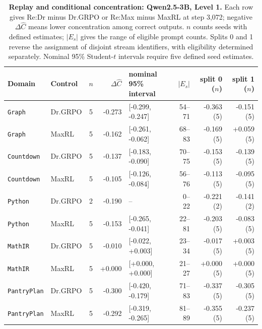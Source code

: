 \begin{table}[!htbp]
\centering
\scriptsize
\setlength{\tabcolsep}{3pt}
\begin{tabular}{@{}llcrlrrr@{}}
\toprule
Domain & Control & $n$ & $\Delta\widehat C$ & nominal 95\% interval & $|E_s|$ & split 0 ($n$) & split 1 ($n$) \\
\midrule
\texttt{Graph} & Dr.GRPO & 5 & -0.273 & [-0.299, -0.247] & 54--71 & -0.363 (5) & -0.151 (5) \\
\texttt{Graph} & MaxRL & 5 & -0.162 & [-0.261, -0.062] & 68--83 & -0.169 (5) & +0.059 (5) \\
\texttt{Countdown} & Dr.GRPO & 5 & -0.137 & [-0.183, -0.090] & 70--75 & -0.153 (5) & -0.139 (5) \\
\texttt{Countdown} & MaxRL & 5 & -0.105 & [-0.126, -0.084] & 56--76 & -0.113 (5) & -0.095 (5) \\
\texttt{Python} & Dr.GRPO & 2 & -0.190 & -- & 0--22 & -0.221 (2) & -0.141 (2) \\
\texttt{Python} & MaxRL & 5 & -0.153 & [-0.265, -0.041] & 22--81 & -0.203 (5) & -0.083 (5) \\
\texttt{MathIR} & Dr.GRPO & 5 & -0.010 & [-0.022, +0.003] & 23--34 & -0.017 (5) & +0.003 (5) \\
\texttt{MathIR} & MaxRL & 5 & +0.000 & [+0.000, +0.000] & 21--27 & +0.000 (5) & +0.000 (5) \\
\texttt{PantryPlan} & Dr.GRPO & 5 & -0.300 & [-0.420, -0.179] & 71--83 & -0.337 (5) & -0.305 (5) \\
\texttt{PantryPlan} & MaxRL & 5 & -0.292 & [-0.319, -0.265] & 81--89 & -0.355 (5) & -0.237 (5) \\
\bottomrule
\end{tabular}
\caption{\textbf{Replay and conditional concentration: Qwen2.5-3B, Level 1.} Each row gives Re:Dr minus Dr.GRPO or Re:Max minus MaxRL at step 3,072; negative $\Delta\widehat C$ means lower concentration among correct outputs. $n$ counts seeds with defined estimates; $|E_s|$ gives the range of eligible prompt counts. Splits 0 and 1 reverse the assignment of disjoint stream identifiers, with eligibility determined separately. Nominal 95\% Student-$t$ intervals require five defined seed estimates.}
\end{table}

